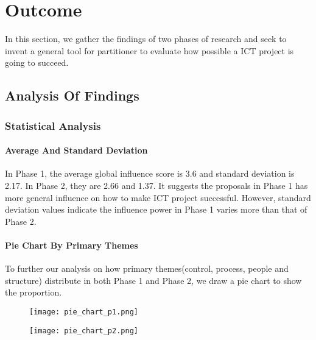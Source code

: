 
\section{Outcome}
In this section, we gather the findings of two phases of research and seek to invent a general tool for partitioner to evaluate how possible a ICT project is going to succeed.

\subsection{Analysis Of Findings}

\subsubsection{Statistical Analysis}
\paragraph{Average And Standard Deviation}
In Phase 1, the average global influence score is 3.6 and standard deviation
is 2.17. In Phase 2, they are 2.66 and 1.37. It suggests the proposals in Phase 1 has more general influence on how to make ICT project successful. However, standard deviation values indicate the influence power in Phase 1 varies more than that of Phase 2.
\paragraph{Pie Chart By Primary Themes}
To further our analysis on how primary themes(control, process, people and structure) distribute in both Phase 1 and Phase 2, we draw a pie chart to show the proportion.

\begin{figure}
\centering
\begin{minipage}{.5\textwidth}
  \centering
  \texttt{[image: pie\_chart\_p1.png]}
  \label{pie:1}
\end{minipage}%
\begin{minipage}{.5\textwidth}
  \centering
  \texttt{[image: pie\_chart\_p2.png]}
  \label{pie:2}
\end{minipage}
\end{figure}

